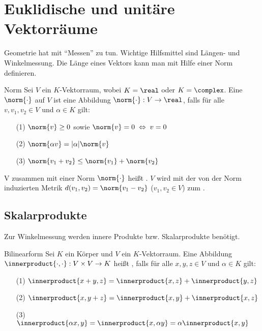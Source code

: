 \chapter{%
    Euklidische und unitäre Vektorräume%
}

\begin{Bem}
    Geometrie hat mit "`Messen"' zu tun.
    Wichtige Hilfsmittel sind Längen- und Winkelmessung.
    Die Länge eines Vektors kann man mit Hilfe einer Norm definieren.
\end{Bem}

\begin{Def}{Norm}
    Sei $V$ ein $K$-Vektorraum, wobei $K = \real$ oder $K = \complex$.
    Eine  $\norm{\cdot}$ auf $V$ ist eine Abbildung
    $\norm{\cdot}: V \rightarrow \real$, falls für alle $v, v_1, v_2 \in V$
    und $\alpha \in K$ gilt:
    \begin{enumerate}
        \item[(1)] $\norm{v} \ge 0$ \quad sowie \quad
        $\norm{v} = 0 \;\Leftrightarrow\; v = 0$

        \item[(2)] $\norm{\alpha v} = |\alpha| \norm{v}$

        \item[(3)] $\norm{v_1 + v_2} \le \norm{v_1} + \norm{v_2}$
    \end{enumerate}
    V zusammen mit einer Norm $\norm{\cdot}$ heißt
    .
    $V$ wird mit der von der Norm induzierten Metrik
    $d(v_1, v_2) = \norm{v_1 - v_2}$ ($v_1, v_2 \in V$) zum
    .
\end{Def}

\section{%
    Skalarprodukte%
}

\begin{Bem}
    Zur Winkelmessung werden innere Produkte bzw. Skalarprodukte benötigt.
\end{Bem}

\begin{Def}{Bilinearform}
    Sei $K$ ein Körper und $V$ ein $K$-Vektorraum.
    Eine Abbildung $\innerproduct{\cdot, \cdot}: V \times V \rightarrow K$ heißt
    , falls für alle $x, y, z \in V$ und $\alpha \in K$ gilt:
    \begin{enumerate}
        \item[(1)] $\innerproduct{x + y, z} = \innerproduct{x, z} + \innerproduct{y, z}$

        \item[(2)] $\innerproduct{x, y + z} = \innerproduct{x, y} + \innerproduct{x, z}$

        \item[(3)] $\innerproduct{\alpha x, y} = \innerproduct{x, \alpha y} = \alpha \innerproduct{x, y}$
    \end{enumerate}
\end{Def}

